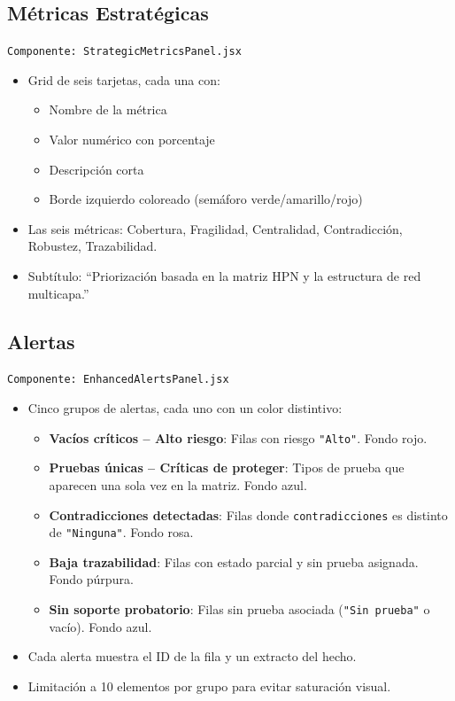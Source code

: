 \documentclass[12pt, letterpaper]{article}
\begin{document}
\subsection{Métricas Estratégicas}

\texttt{Componente: StrategicMetricsPanel.jsx}

\begin{itemize}[nosep]
  \item Grid de seis tarjetas, cada una con:
    \begin{itemize}[nosep]
      \item Nombre de la métrica
      \item Valor numérico con porcentaje
      \item Descripción corta
      \item Borde izquierdo coloreado (semáforo verde/amarillo/rojo)
    \end{itemize}
  \item Las seis métricas: Cobertura, Fragilidad, Centralidad,
    Contradicción, Robustez, Trazabilidad.
  \item Subtítulo: ``Priorización basada en la matriz HPN y la
    estructura de red multicapa.''
\end{itemize}

\subsection{Alertas}

\texttt{Componente: EnhancedAlertsPanel.jsx}

\begin{itemize}[nosep]
  \item Cinco grupos de alertas, cada uno con un color distintivo:
    \begin{itemize}[nosep]
      \item \textbf{Vacíos críticos -- Alto riesgo}: Filas con
        riesgo \texttt{"Alto"}. Fondo rojo.
      \item \textbf{Pruebas únicas -- Críticas de proteger}: Tipos
        de prueba que aparecen una sola vez en la matriz. Fondo azul.
      \item \textbf{Contradicciones detectadas}: Filas donde
        \texttt{contradicciones} es distinto de \texttt{"Ninguna"}.
        Fondo rosa.
      \item \textbf{Baja trazabilidad}: Filas con estado parcial
        y sin prueba asignada. Fondo púrpura.
      \item \textbf{Sin soporte probatorio}: Filas sin prueba
        asociada (\texttt{"Sin prueba"} o vacío). Fondo azul.
    \end{itemize}
  \item Cada alerta muestra el ID de la fila y un extracto del hecho.
  \item Limitación a 10 elementos por grupo para evitar saturación
    visual.
\end{itemize}
\end{document}
